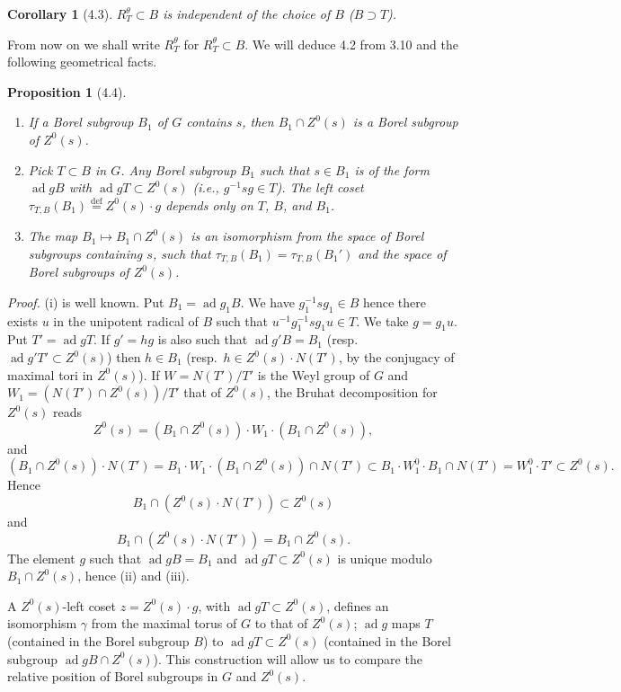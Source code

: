 \documentclass[11pt]{amsart}
\theoremstyle{plain}
\newtheorem{proposition}[theorem]{Proposition}
\newtheorem{corollary}[theorem]{Corollary}
\theoremstyle{remark}
\DeclareMathOperator{\ad}{ad}
\begin{document}
\begin{corollary}[4.3]
$R_T^\theta \subset B$ is independent of the choice of $B$ ($B \supset T$).
\end{corollary}

From now on we shall write $R_T^\theta$ for $R_T^\theta \subset B$. We will deduce 4.2 from 3.10 and the following geometrical facts.

\begin{proposition}[4.4]
\begin{enumerate}
\item[(i)] If a Borel subgroup $B_1$ of $G$ contains $s$, then $B_1 \cap Z^0(s)$ is a Borel subgroup of $Z^0(s)$.
\item[(ii)] Pick $T \subset B$ in $G$. Any Borel subgroup $B_1$ such that $s \in B_1$ is of the form $\ad g B$ with $\ad g T \subset Z^0(s)$ (i.e., $g^{-1}sg \in T$). The left coset $\tau_{T,B}(B_1) \overset{\text{def}}{=} Z^0(s) \cdot g$ depends only on $T$, $B$, and $B_1$.
\item[(iii)] The map $B_1 \mapsto B_1 \cap Z^0(s)$ is an isomorphism from the space of Borel subgroups containing $s$, such that $\tau_{T,B}(B_1) = \tau_{T,B}(B_1')$ and the space of Borel subgroups of $Z^0(s)$.
\end{enumerate}
\end{proposition}

\textit{Proof.} (i) is well known. Put $B_1 = \ad g_1 B$. We have $g_1^{-1}sg_1 \in B$ hence there exists $u$ in the unipotent radical of $B$ such that $u^{-1}g_1^{-1}sg_1u \in T$. We take $g = g_1u$. Put $T' = \ad g T$. If $g' = hg$ is also such that $\ad g' B = B_1$ (resp.\ $\ad g' T' \subset Z^0(s)$) then $h \in B_1$ (resp.\ $h \in Z^0(s) \cdot N(T')$, by the conjugacy of maximal tori in $Z^0(s)$). If $W = N(T')/T'$ is the Weyl group of $G$ and $W_1 = (N(T') \cap Z^0(s))/T'$ that of $Z^0(s)$, the Bruhat decomposition for $Z^0(s)$ reads
\[
Z^0(s) = (B_1 \cap Z^0(s)) \cdot W_1 \cdot (B_1 \cap Z^0(s)),
\]
and
\[
(B_1 \cap Z^0(s)) \cdot N(T') = B_1 \cdot W_1 \cdot (B_1 \cap Z^0(s)) \cap N(T') \subset B_1 \cdot W_1^0 \cdot B_1 \cap N(T') = W_1^0 \cdot T' \subset Z^0(s).
\]
Hence
\[
B_1 \cap (Z^0(s) \cdot N(T')) \subset Z^0(s)
\]
and
\[
B_1 \cap (Z^0(s) \cdot N(T')) = B_1 \cap Z^0(s).
\]
The element $g$ such that $\ad g B = B_1$ and $\ad g T \subset Z^0(s)$ is unique modulo $B_1 \cap Z^0(s)$, hence (ii) and (iii).

A $Z^0(s)$-left coset $z = Z^0(s) \cdot g$, with $\ad g T \subset Z^0(s)$, defines an isomorphism $\gamma$ from the maximal torus of $G$ to that of $Z^0(s)$; $\ad g$ maps $T$ (contained in the Borel subgroup $B$) to $\ad g T \subset Z^0(s)$ (contained in the Borel subgroup $\ad g B \cap Z^0(s)$). This construction will allow us to compare the relative position of Borel subgroups in $G$ and $Z^0(s)$.
\end{document}
